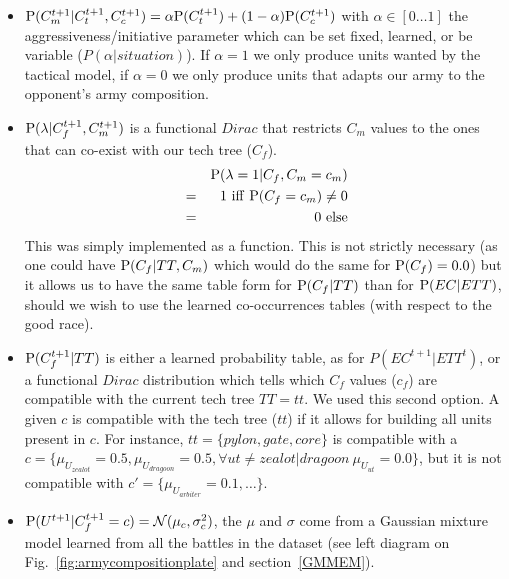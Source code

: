 \begin{itemize}
\item $\mathrm{P}(C_m^{t+1}|C_t^{t+1},C_c^{t+1}) = \alpha \mathrm{P}(C_t^{t+1})+(1-\alpha) \mathrm{P}(C_c^{t+1})$ with $\alpha \in [0\dots1]$ the aggressiveness/initiative parameter which can be set fixed, learned, or be variable ($P(\alpha|situation)$). If $\alpha=1$ we only produce units wanted by the tactical model, if $\alpha=0$ we only produce units that adapts our army to the opponent's army composition.

\item $\mathrm{P}(\lambda | C_f^{t+1},C_m^{t+1})$ is a functional $Dirac$ that restricts $C_m$ values to the ones that can co-exist with our tech tree ($C_f$).
\begin{eqnarray*}
& & \mathrm{P}(\lambda = 1 | C_f, C_m=c_m) \\
& = & 1\ \mathrm{iff\ } \mathrm{P}(C_f=c_m) \neq 0\\
& = & 0\ \mathrm{else}
\end{eqnarray*}
This was simply implemented as a function. This is not strictly necessary (as one could have $\mathrm{P}(C_f|TT,C_m)$ which would do the same for $\mathrm{P}(C_f)=0.0$) but it allows us to have the same table form for $\mathrm{P}(C_f|TT)$ than for $\mathrm{P}(EC|ETT)$, should we wish to use the learned co-occurrences tables (with respect to the good race).

\item $\mathrm{P}(C_f^{t+1}|TT)$ is either a learned probability table, as for $P(EC^{t+1}|ETT^t)$, or a functional $Dirac$ distribution which tells which $C_f$ values ($c_f$) are compatible with the current tech tree $TT=tt$. We used this second option. A given $c$ is compatible with the tech tree ($tt$) if it allows for building all units present in $c$. For instance, $tt=\{pylon, gate, core\}$ is compatible with a $c=\{\mu_{U_{zealot}}=0.5, \mu_{U_{dragoon}}=0.5, \forall ut \neq zealot|dragoon\ \mu_{U_{ut}}=0.0\}$, but it is not compatible with $c'=\{\mu_{U_{arbiter}}=0.1, \dots\}$.

\item $\mathrm{P}(U^{t+1}|C_f^{t+1}=c) = \mathcal{N}(\mu_{c},\sigma_{c}^2)$, the $\mu$ and $\sigma$ come from a Gaussian mixture model learned from all the battles in the dataset (see left diagram on Fig.~\ref{fig:armycompositionplate} and section~\ref{GMMEM}). 



\end{itemize}

